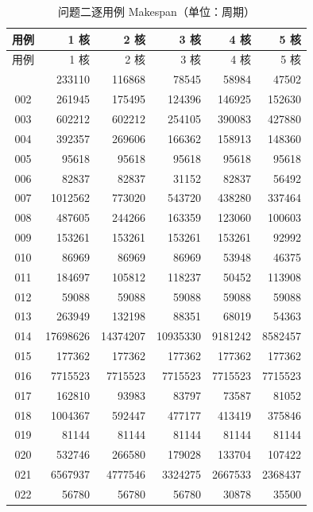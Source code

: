 \scriptsize
\setlength{\tabcolsep}{2.5pt}
\renewcommand{\arraystretch}{0.95}
\begin{longtable}{|c|r|r|r|r|r|}
\caption{问题二逐用例 Makespan（单位：周期）}\label{tab:q2_makespan}\\
\hline
用例 & 1 核 & 2 核 & 3 核 & 4 核 & 5 核 \\
\hline
\endfirsthead
\hline
用例 & 1 核 & 2 核 & 3 核 & 4 核 & 5 核 \\
\hline
\endhead
\hline
\endfoot
001 & 233110 & 116868 & 78545 & 58984 & 47502 \\
\hline
002 & 261945 & 175495 & 124396 & 146925 & 152630 \\
\hline
003 & 602212 & 602212 & 254105 & 390083 & 427880 \\
\hline
004 & 392357 & 269606 & 166362 & 158913 & 148360 \\
\hline
005 & 95618 & 95618 & 95618 & 95618 & 95618 \\
\hline
006 & 82837 & 82837 & 31152 & 82837 & 56492 \\
\hline
007 & 1012562 & 773020 & 543720 & 438280 & 337464 \\
\hline
008 & 487605 & 244266 & 163359 & 123060 & 100603 \\
\hline
009 & 153261 & 153261 & 153261 & 153261 & 92992 \\
\hline
010 & 86969 & 86969 & 86969 & 53948 & 46375 \\
\hline
011 & 184697 & 105812 & 118237 & 50452 & 113908 \\
\hline
012 & 59088 & 59088 & 59088 & 59088 & 59088 \\
\hline
013 & 263949 & 132198 & 88351 & 68019 & 54363 \\
\hline
014 & 17698626 & 14374207 & 10935330 & 9181242 & 8582457 \\
\hline
015 & 177362 & 177362 & 177362 & 177362 & 177362 \\
\hline
016 & 7715523 & 7715523 & 7715523 & 7715523 & 7715523 \\
\hline
017 & 162810 & 93983 & 83797 & 73587 & 81052 \\
\hline
018 & 1004367 & 592447 & 477177 & 413419 & 375846 \\
\hline
019 & 81144 & 81144 & 81144 & 81144 & 81144 \\
\hline
020 & 532746 & 266580 & 179028 & 133704 & 107422 \\
\hline
021 & 6567937 & 4777546 & 3324275 & 2667533 & 2368437 \\
\hline
022 & 56780 & 56780 & 56780 & 30878 & 35500 \\

\end{longtable}
